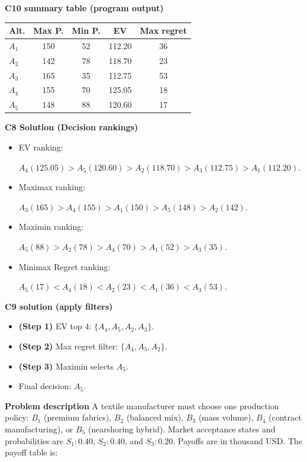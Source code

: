 \begin{ExamProblems}
		\vspace{0.25cm}
		
		\textbf{C10 summary table (program output)}\par
		\begin{center}
			\begin{tabular}{l c c c c}
				\hline
				Alt. & Max P. & Min P. & EV & Max regret \\
				\hline
				$A_1$ & 150 & 52 & 112.20 & 36 \\
				$A_2$ & 142 & 78 & 118.70 & 23 \\
				$A_3$ & 165 & 35 & 112.75 & 53 \\
				$A_4$ & 155 & 70 & 125.05 & 18 \\
				$A_5$ & 148 & 88 & 120.60 & 17 \\
				\hline
			\end{tabular}
		\end{center}
		
		\textbf{C8 Solution (Decision rankings)}\par
		\begin{itemize}
			\item EV ranking: \par $A_4(125.05)>A_5(120.60)>A_2(118.70)>A_3(112.75)>A_1(112.20)$.
			\item Maximax ranking:\par $A_3(165)>A_4(155)>A_1(150)>A_5(148)>A_2(142)$.
			\item Maximin ranking: \par $A_5(88)>A_2(78)>A_4(70)>A_1(52)>A_3(35)$.
			\item Minimax Regret ranking:\par $A_5(17)<A_4(18)<A_2(23)<A_1(36)<A_3(53)$.
		\end{itemize}
		
		\textbf{C9 solution (apply filters)}\par
		\begin{itemize}
			\item \textbf{(Step 1)} EV top 4: $\{A_4,A_5,A_2,A_3\}$.
			\item \textbf{(Step 2)} Max regret filter: $\{A_4,A_5,A_2\}$.
			\item \textbf{(Step 3)} Maximin selects $A_5$.
			\item Final decision: $A_5$.
		\end{itemize}
		
		\newpage
		\item
		\textbf{Problem description}
		A textile manufacturer must choose one production policy: $B_1$ (premium fabrics), $B_2$ (balanced mix), $B_3$ (mass volume), $B_4$ (contract manufacturing), or $B_5$ (nearshoring hybrid).
		Market acceptance states and probabilities are $S_1:0.40$, $S_2:0.40$, and $S_3:0.20$. Payoffs are in thousand USD. The payoff table is:
		

\end{ExamProblems}
